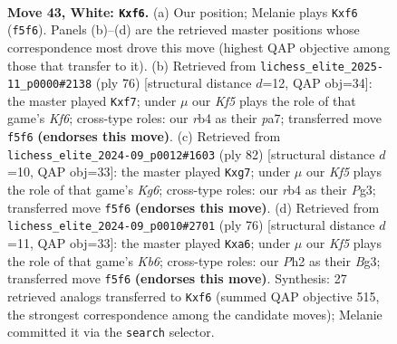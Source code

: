 \documentclass[11pt]{article}
\begin{document}
\clearpage

\begin{figure}[p]\centering
\begin{subfigure}{0.46\textwidth}\centering
\resizebox{\linewidth}{!}{%
\newchessgame
\chessboard[
  setfen={8/p2p3k/2p2p2/5K2/1r1P4/8/5P1P/8 w - - 2 43},
  showmover=false,
  pgfstyle=straightmove, color=movearrow, markmove={f5-f6}
]}
\caption{}
\end{subfigure}\hfill
\begin{subfigure}{0.46\textwidth}\centering
\resizebox{\linewidth}{!}{%
\newchessgame
\chessboard[
  setfen={8/pp3p2/2p1pK2/P7/1k4P1/4P3/8/8 w - - 0 39},
  showmover=false,
  pgfstyle=straightmove, color=movearrow, markmove={f6-f7}
]}
\caption{}
\end{subfigure}
\\[4pt]
\begin{subfigure}{0.46\textwidth}\centering
\resizebox{\linewidth}{!}{%
\newchessgame
\chessboard[
  setfen={8/pp4p1/6Kp/8/2P5/1P4P1/k7/8 w - - 0 42},
  showmover=false,
  pgfstyle=straightmove, color=movearrow, markmove={g6-g7}
]}
\caption{}
\end{subfigure}\hfill
\begin{subfigure}{0.46\textwidth}\centering
\resizebox{\linewidth}{!}{%
\newchessgame
\chessboard[
  setfen={8/7p/pK4p1/1p1k4/8/P4PB1/8/8 w - - 4 39},
  showmover=false,
  pgfstyle=straightmove, color=movearrow, markmove={b6-a6}
]}
\caption{}
\end{subfigure}
\caption{\textbf{Move 43, White: \texttt{Kxf6}.} (a) Our position; Melanie plays \texttt{Kxf6} (\texttt{f5f6}). Panels (b)--(d) are the retrieved master positions whose correspondence most drove this move (highest QAP objective among those that transfer to it). (b) Retrieved from \texttt{lichess\_elite\_2025-11\_p0000\#2138} (ply 76) [structural distance $d$=12, QAP obj=34]: the master played \texttt{Kxf7}; under $\mu$ our \emph{Kf5} plays the role of that game's \emph{Kf6}; cross-type roles: our \emph{r}b4 as their \emph{p}a7; transferred move \texttt{f5f6} \textbf{(endorses this move)}. (c) Retrieved from \texttt{lichess\_elite\_2024-09\_p0012\#1603} (ply 82) [structural distance $d$=10, QAP obj=33]: the master played \texttt{Kxg7}; under $\mu$ our \emph{Kf5} plays the role of that game's \emph{Kg6}; cross-type roles: our \emph{r}b4 as their \emph{P}g3; transferred move \texttt{f5f6} \textbf{(endorses this move)}. (d) Retrieved from \texttt{lichess\_elite\_2024-09\_p0010\#2701} (ply 76) [structural distance $d$=11, QAP obj=33]: the master played \texttt{Kxa6}; under $\mu$ our \emph{Kf5} plays the role of that game's \emph{Kb6}; cross-type roles: our \emph{P}h2 as their \emph{B}g3; transferred move \texttt{f5f6} \textbf{(endorses this move)}. Synthesis: 27 retrieved analogs transferred to \texttt{Kxf6} (summed QAP objective 515, the strongest correspondence among the candidate moves); Melanie committed it via the \texttt{search} selector.}
\label{fig:thought-m84}
\end{figure}
\end{document}
